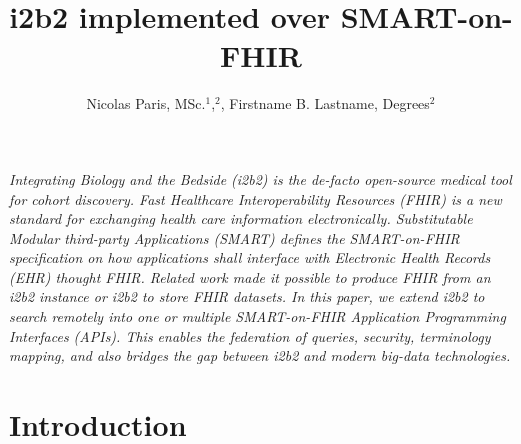 \documentclass{amia}
\begin{document}
\title{i2b2 implemented over SMART-on-FHIR} 
\author{Nicolas Paris, MSc.$^{1}$,$^{2}$, Firstname B. Lastname, Degrees$^{2}$}


\maketitle


\textit{Integrating Biology and the Bedside (i2b2) is the de-facto open-source medical tool for cohort discovery. Fast Healthcare Interoperability Resources (FHIR) is a new standard for exchanging health care information electronically. Substitutable Modular third-party Applications (SMART) defines the SMART-on-FHIR specification on how applications shall interface with  Electronic Health Records (EHR) thought FHIR. Related work made it possible to produce FHIR from an i2b2 instance or i2b2 to store FHIR datasets. In this paper, we extend i2b2 to search remotely into one or multiple SMART-on-FHIR Application Programming Interfaces (APIs). This enables the federation of queries, security, terminology mapping, and also bridges the gap between i2b2 and modern big-data technologies.}

\section*{Introduction}
\end{document}
